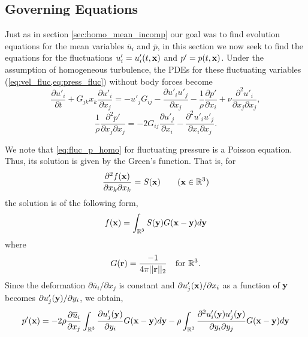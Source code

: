 \documentclass[oneside,a4paper,11pt]{report}
\newcommand{\pavg}{\overline{p}}
\newcommand{\uavg}{\overline{u}}
\newcommand{\pfluc}{p'}
\newcommand{\ufluc}{u'}
\begin{document}
\subsection{Governing Equations}
Just as in section \ref{sec:homo_mean_incomp} our goal was to find evolution equations for the mean variables $\uavg_i$ and $\pavg$, in this section we now seek to find the equations for the fluctuations $\ufluc_i = \ufluc_i(t,\xvec)$ and $\pfluc= p(t,\xvec)$. Under the assumption of homogeneous turbulence, the PDEs for these fluctuating variables (\cref{eq:vel_fluc,eq:press_fluc}) without body forces become 
\begin{equation}
\label{eq:fluc_u_homo}
\frac{\partial \ufluc_i}{\partial t} + G_{jk} x_k \frac{\partial \ufluc_i}{\partial x_j} = -\ufluc_j G_{ij} - \frac{\partial \ufluc_i \ufluc_j}{\partial x_j} - \frac{1}{\rho} \frac{\partial \pfluc}{\partial x_i} + \nu \frac{\partial^2 \ufluc_i}{\partial x_j \partial x_j},
\end{equation}
\begin{equation}
\label{eq:fluc_p_homo}
\frac{1}{\rho} \frac{\partial^2 \pfluc}{\partial x_j \partial x_j} = -2 G_{ij} \frac{\partial \ufluc_j}{\partial x_i} - \frac{\partial^2 \ufluc_i \ufluc_j}{\partial x_i \partial x_j}.
\end{equation}

We note that \cref{eq:fluc_p_homo} for fluctuating pressure is a Poisson equation. Thus, its solution is given by the Green's function. That is, for 
\begin{equation}
\frac{\partial^2 f(\mathbf{x})}{\partial x_k \partial x_k} = S(\mathbf{x}) \qquad (\mathbf{x} \in {\mathbb{R}^3})
\end{equation}
the solution is of the following form, 
\begin{equation}
f(\mathbf{x}) = \int_{\mathbb{R}^3} S(\mathbf{y}) G(\mathbf{x} - \mathbf{y}) d\mathbf{y}
\end{equation}
where 
\begin{equation}
G(\mathbf{r}) = \frac{-1}{4\pi ||\mathbf{r}||_2} \quad \text{for } {\mathbb{R}^3}.
\end{equation}
Since the deformation $\partial \uavg_i / \partial x_j$ is constant and $\partial \ufluc_j(\xvec) / \partial x_i$ as a function of $\mathbf{y}$ becomes $\partial \ufluc_j(\yvec) / \partial y_i$, we obtain,
\begin{equation}
\label{eq:pfluc_homo}
\pfluc(\xvec) =  -2 \rho \frac{\partial \uavg_i}{\partial x_j} \int_\Rthree \frac{\partial \ufluc_j(\yvec)}{\partial y_i} G(\xvec-\yvec) d\yvec - \rho \int_\Rthree \frac{\partial^2 \ufluc_i(\yvec) \ufluc_j(\yvec)}{\partial y_i \partial y_j} G(\xvec - \yvec) d\yvec 
\end{equation}
\end{document}
